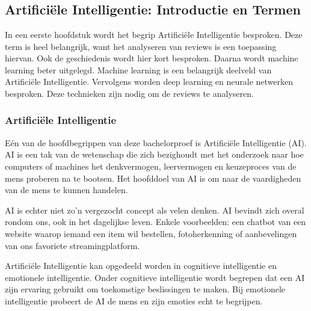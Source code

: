 \chapter{}
\label{ch:stand-van-zaken}




\section{Artificiële Intelligentie: Introductie en Termen}
\label{sec:artificiëleintelligentieintroductie}
In een eerste hoofdstuk wordt het begrip Artificiële Intelligentie besproken. Deze term is heel belangrijk, want het analyseren van reviews is een toepassing hiervan. Ook de geschiedenis wordt hier kort besproken. Daarna wordt machine learning beter uitgelegd. Machine learning is een belangrijk deelveld van Artificiële Intelligentie. Vervolgens worden deep learning en neurale netwerken besproken. Deze technieken zijn nodig om de reviews te analyseren. 

\subsection{Artificiële Intelligentie}
\label{sec:artificiëleintelligentie}
Eén van de hoofdbegrippen van deze bachelorproef is Artificiële Intelligentie (AI). \gls{AI} is een tak van de wetenschap die zich bezighoudt met het onderzoek naar hoe computers of machines het denkvermogen, leervermogen en keuzeproces van de mens proberen na te bootsen. Het hoofddoel van AI is om naar de vaardigheden van de mens te kunnen handelen. \autocite{IBM2021}

AI is echter niet zo'n vergezocht concept als velen denken. AI bevindt zich overal rondom ons, ook in het dagelijkse leven. Enkele voorbeelden: een chatbot van een website waarop iemand een item wil bestellen, fotoherkenning of aanbevelingen van ons favoriete streamingplatform. \autocite{IBM2021}

Artificiële Intelligentie kan opgedeeld worden in cognitieve intelligentie en emotionele intelligentie. Onder cognitieve intelligentie wordt begrepen dat een AI zijn ervaring gebruikt om toekomstige beslissingen te maken. Bij emotionele intelligentie probeert de AI de mens en zijn emoties echt te begrijpen. \autocite{Andreas2018}

